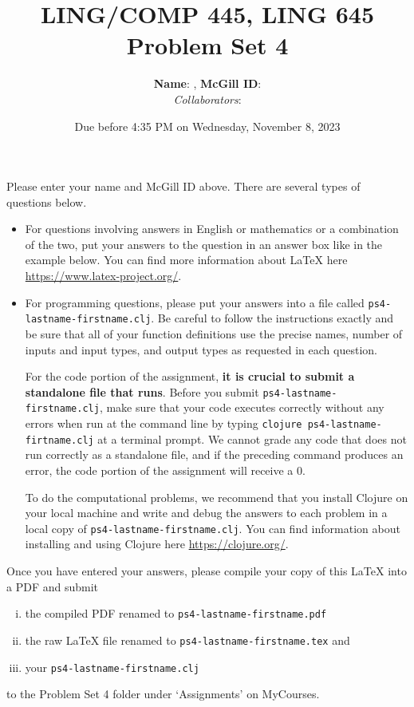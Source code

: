 \documentclass[10pt]{article}
\author{
  \textbf{Name}:       %
, \textbf{McGill ID}:  %
\\ \textit{Collaborators}:  %
}
\newcommand{\PSnum}{4}
\begin{document}
\title{LING/COMP 445, LING 645\\Problem Set \PSnum}
\date{Due before 4:35 PM on Wednesday, November 8, 2023}
\maketitle
Please enter your name and McGill ID above.
There are several types of questions below. 
\begin{itemize}
\item
For questions involving answers in English or mathematics or a
combination of the two, put your answers to the question in an
answer box like in the example below. You can find more
information about \LaTeX{} here \url{https://www.latex-project.org/}.

\item For programming questions,
please put your answers into a file called
\texttt{ps\PSnum-lastname-firstname.clj}. Be careful to follow the instructions
exactly and be sure that all of your function definitions use the
precise names, number of inputs and input types, and output types as
requested in each question.

For the code portion of the assignment, \textbf{it is crucial to submit a
standalone file that runs}. Before you submit \texttt{ps\PSnum-lastname-firstname.clj}, 
make sure that your code executes correctly without any errors 
when run at the command line by typing 
\texttt{clojure ps\PSnum-lastname-firtname.clj} at a terminal
prompt. We cannot grade any code that does not run correctly as a
standalone file, and if the preceding command produces an error,
the code portion of the assignment will receive a $0$.

To do the computational problems, we recommend that you install
Clojure on your local machine and write and debug the answers to each
problem in a local copy of \texttt{ps\PSnum-lastname-firstname.clj}. You can
find information about installing and using Clojure here
\url{https://clojure.org/}.
\end{itemize}
Once you have entered your answers, please compile your copy of this
\LaTeX{} into a PDF and submit 
\begin{enumerate}[(i),noitemsep]
\item
the compiled PDF renamed to
\texttt{ps\PSnum-lastname-firstname.pdf} 
\item
the raw \LaTeX{} file renamed to
\texttt{ps\PSnum-lastname-firstname.tex} and 
\item
your \texttt{ps\PSnum-lastname-firstname.clj}
\end{enumerate}
to the Problem Set \PSnum{} folder under `Assignments' on MyCourses.
\end{document}
